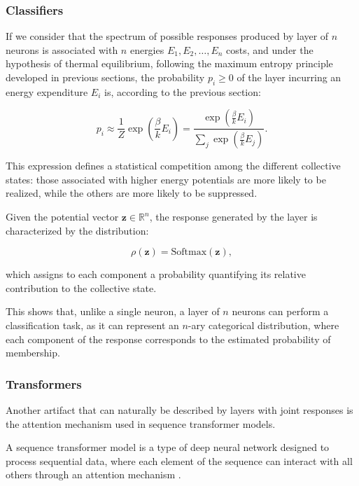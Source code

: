 \documentclass[12pt]{article}
\begin{document}
\subsubsection*{Classifiers}

If we consider that the spectrum of possible responses produced by layer of $n$ neurons is associated with $n$ energies $E_1, E_2, \ldots, E_n$ costs, and under the hypothesis of thermal equilibrium, following the maximum entropy principle developed in previous sections, the probability $p_i \ge 0$ of the layer incurring an energy expenditure $E_i$ is, according to the previous section:

\begin{equation}
p_i \approx \frac{1}{Z} \exp\left(\frac{\beta}{k} E_i\right)  
= \frac{\exp\left(\frac{\beta}{k} E_i\right)}{\sum_j \exp\left(\frac{\beta}{k} E_j\right)}.
\end{equation}

This expression defines a statistical competition among the different collective states: those associated with higher energy potentials are more likely to be realized, while the others are more likely to be suppressed.

Given the potential vector $\mathbf{z} \in \mathbb{R}^n$, the response generated by the layer is characterized by the distribution:

\begin{equation}
\rho(\mathbf{z}) = \text{Softmax}(\mathbf{z}),
\end{equation}

which assigns to each component a probability quantifying its relative contribution to the collective state.

This shows that, unlike a single neuron, a layer of $n$ neurons can perform a classification task, as it can represent an $n$-ary categorical distribution, where each component of the response corresponds to the estimated probability of membership.
\subsubsection*{Transformers}

Another artifact that can naturally be described by layers with joint responses is the attention mechanism used in sequence transformer models.

A sequence transformer model is a type of deep neural network designed to process sequential data, where each element of the sequence can interact with all others through an attention mechanism \cite{vaswani2017attention}.
\end{document}
